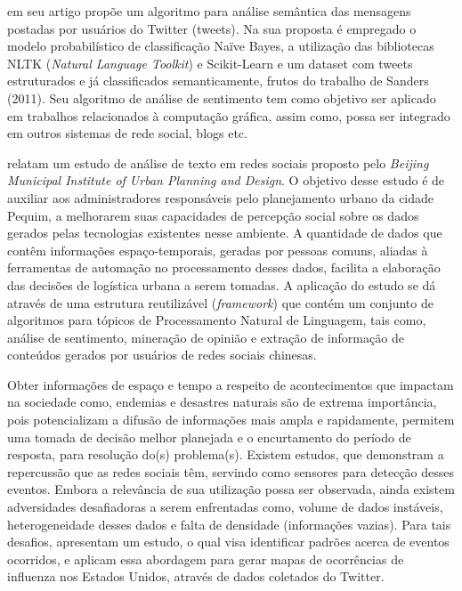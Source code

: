 \cite{Weiand:16} em seu artigo propõe um algoritmo para análise semântica das mensagens postadas por usuários do Twitter (tweets).
Na sua proposta é empregado o modelo probabilístico de classificação Naïve Bayes, a utilização das bibliotecas NLTK (\textit{Natural Language Toolkit}) e Scikit-Learn e um dataset com tweets estruturados e já classificados semanticamente, frutos do trabalho de Sanders (2011).
Seu algoritmo de análise de sentimento tem como objetivo ser aplicado em trabalhos relacionados à computação gráfica, assim como, possa ser integrado em outros sistemas de rede social, blogs etc.

\cite{GaoEtAl:17} relatam um estudo de análise de texto em redes sociais proposto pelo \textit{Beijing Municipal Institute of Urban Planning and Design}. O objetivo desse estudo é de auxiliar aos administradores responsáveis pelo planejamento urbano da cidade Pequim, a melhorarem suas capacidades de percepção social sobre os dados gerados pelas tecnologias existentes nesse ambiente.
A quantidade de dados que contêm informações espaço-temporais, geradas por pessoas comuns, aliadas à ferramentas de automação no processamento desses dados, facilita a elaboração das decisões de logística urbana a serem tomadas.
A aplicação do estudo se dá através de uma estrutura reutilizável (\textit{framework}) que contém um conjunto de algoritmos para tópicos de Processamento Natural de Linguagem, tais como, análise de sentimento, mineração de opinião e extração de informação de conteúdos gerados por usuários de redes sociais chinesas.

Obter informações de espaço e tempo a respeito de acontecimentos que impactam na sociedade como, endemias e desastres naturais são de extrema importância, pois potencializam a difusão de informações mais ampla e rapidamente, permitem uma tomada de decisão melhor planejada e o encurtamento do período de resposta, para resolução do(s) problema(s).
Existem estudos, que demonstram a repercussão que as redes sociais têm, servindo como sensores para detecção desses eventos. 
Embora a relevância de sua utilização possa ser observada, ainda existem adversidades desafiadoras a serem enfrentadas como, volume de dados instáveis, heterogeneidade desses dados e falta de densidade (informações vazias). Para tais desafios,  \cite{GaoEtAlInfluenza:18} apresentam um estudo, o qual visa identificar padrões acerca de eventos ocorridos, e aplicam essa abordagem para gerar mapas de ocorrências de influenza nos Estados Unidos, através de dados coletados do Twitter.

